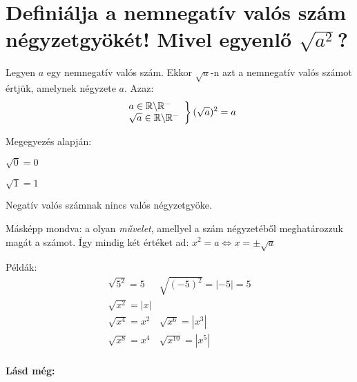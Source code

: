 
\section{Definiálja a nemnegatív valós szám négyzetgyökét! Mivel egyenlő 
\texorpdfstring{$\sqrt{a^2}$}{sqrt(a**2)}?}
\label{008}

\begin{defin}[Négyzetgyök]
Legyen $a$ egy nemnegatív valós szám. Ekkor $\sqrt{a}$-n azt a nemnegatív valós
számot értjük, amelynek négyzete $a$. Azaz:
\[
\left.
\begin{array}{l}
  a \in \mathbb{R} \backslash \mathbb{R}^-\\
  \sqrt{a} \in \mathbb{R} \backslash \mathbb{R}^-
\end{array}
\right\} 
(\sqrt{a})^2 = a
\]

Megegyezés alapján:

$\sqrt{0} = 0$

$\sqrt{1} = 1$

Negatív valós számnak nincs valós négyzetgyöke.

Másképp mondva: a  olyan \emph{művelet}, amellyel a
szám négyzetéből meghatározzuk magát a számot. Így mindig két értéket ad:
$x^2 = a \Leftrightarrow x = \pm \sqrt{a}$
\end{defin}

Példák:
\[
\begin{array}{l|r}
  \sqrt{5^2} = 5   & \sqrt{(-5)^2} = |-5| = 5\\\hline
  \sqrt{x^2} = |x| & \\\hline
  \sqrt{x^4} = x^2 & \sqrt{x^6} = |x^3|\\\hline
  \sqrt{x^8} = x^4 & \sqrt{x^{10}} = |x^5|\\
\end{array}
\]

\textbf{Lásd még:}
